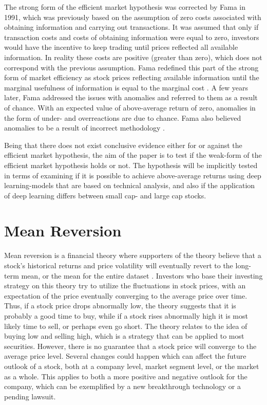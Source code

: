 \indent \newline 
The strong form of the efficient market hypothesis was corrected by Fama in 1991, which was previously based on the assumption of zero costs associated with obtaining information and carrying out transactions. It was assumed that only if transaction costs and costs of obtaining information were equal to zero, investors would have the incentive to keep trading until prices reflected all available information. In reality these costs are positive (greater than zero), which does not correspond with the previous assumption. Fama redefined this part of the strong form of market efficiency as stock prices reflecting available information until the marginal usefulness of information is equal to the marginal cost \cite{lekovic}. A few years later, Fama addressed the issues with anomalies and referred to them as a result of chance. With an expected value of above-average return of zero, anomalies in the form of under- and overreactions are due to chance. Fama also believed anomalies to be a result of incorrect methodology \cite{lekovic}.

\indent \newline 
Being that there does not exist conclusive evidence either for or against the efficient market hypothesis, the aim of the paper is to test if the weak-form of the efficient market hypothesis holds or not. The hypothesis will be implicitly tested in terms of examining if it is possible to achieve above-average returns using deep learning-models that are based on technical analysis, and also if the application of deep learning differs between small cap- and large cap stocks.   

\section{Mean Reversion}
Mean reversion is a financial theory where supporters of the theory believe that a stock's historical returns and price volatility will eventually revert to the long-term mean, or the mean for the entire dataset \cite{chenj}. Investors who base their investing strategy on this theory try to utilize the fluctuations in stock prices, with an expectation of the price eventually converging to the average price over time. Thus, if a stock price drops abnormally low, the theory suggests that it is probably a good time to buy, while if a stock rises abnormally high it is most likely time to sell, or perhaps even go short. The theory relates to the idea of buying low and selling high, which is a strategy that can be applied to most securities. However, there is no guarantee that a stock price will converge to the average price level. Several changes could happen which can affect the future outlook of a stock, both at a company level, market segment level, or the market as a whole. This applies to both a more positive and negative outlook for the company, which can be exemplified by a new breakthrough technology or a pending lawsuit. 

